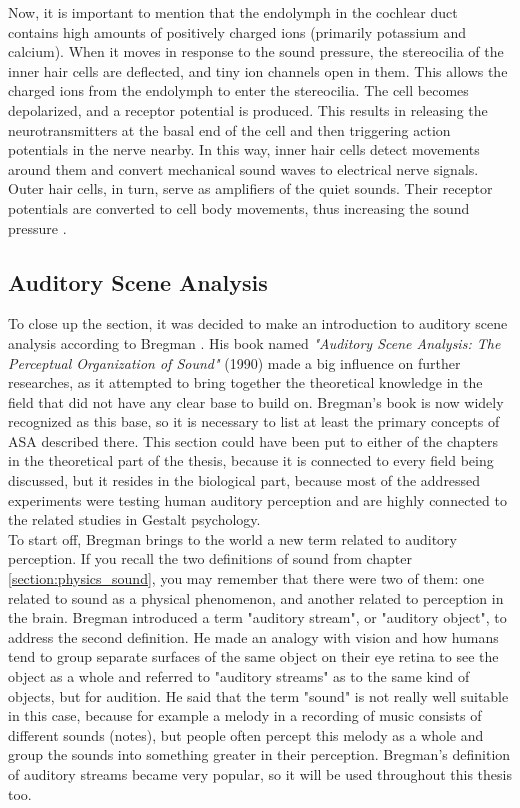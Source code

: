 Now, it is important to mention that the endolymph in the cochlear duct contains high amounts of positively charged ions (primarily potassium and calcium). When it moves in response to the sound pressure, the stereocilia of the inner hair cells are deflected, and tiny ion channels open in them. This allows the charged ions from the endolymph to enter the stereocilia. The cell becomes depolarized, and a receptor potential is produced. This results in releasing the neurotransmitters at the basal end of the cell and then triggering action potentials in the nerve nearby. In this way, inner hair cells detect movements around them and convert mechanical sound waves to electrical nerve signals.\\

Outer hair cells, in turn, serve as amplifiers of the quiet sounds. Their receptor potentials are converted to cell body movements, thus increasing the sound pressure \cite{Hudspeth2008}.

\subsection{Auditory Scene Analysis}\label{section:biology_asa}

To close up the section, it was decided to make an introduction to auditory scene analysis according to Bregman \cite{Bregman1990}. His book named \textit{"Auditory Scene Analysis: The Perceptual Organization of Sound"} (1990) made a big influence on further researches, as it attempted to bring together the theoretical knowledge in the field that did not have any clear base to build on. Bregman's book is now widely recognized as this base, so it is necessary to list at least the primary concepts of ASA described there. This section could have been put to either of the chapters in the theoretical part of the thesis, because it is connected to every field being discussed, but it resides in the biological part, because most of the addressed experiments were testing human auditory perception and are highly connected to the related studies in Gestalt psychology.\\

To start off, Bregman brings to the world a new term related to auditory perception. If you recall the two definitions of sound from chapter \ref{section:physics_sound}, you may remember that there were two of them: one related to sound as a physical phenomenon, and another related to perception in the brain. Bregman introduced a term "auditory stream", or "auditory object", to address the second definition. He made an analogy with vision and how humans tend to group separate surfaces of the same object on their eye retina to see the object as a whole and referred to "auditory streams" as to the same kind of objects, but for audition. He said that the term "sound" is not really well suitable in this case, because for example a melody in a recording of music consists of different sounds (notes), but people often percept this melody as a whole and group the sounds into something greater in their perception. Bregman's definition of auditory streams became very popular, so it will be used throughout this thesis too.\\

